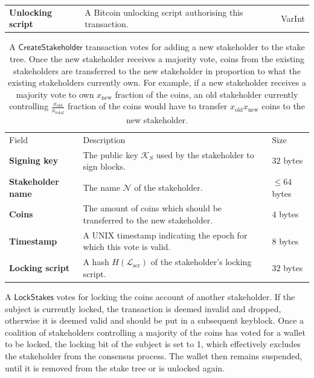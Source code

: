 \documentclass{style/kththesis}
\begin{document}
\begin{appendices}
\begin{table}[ht]
\begin{tabularx}{\textwidth}{lXl}
\textbf{Unlocking script} & A Bitcoin unlocking script authorising this transaction. & VarInt
\end{tabularx}
\end{table}
\begin{table}[ht]
\caption{A $\mathsf{CreateStakeholder}$ transaction votes for adding a new stakeholder to the stake tree. Once the new stakeholder receives a majority vote, coins from the existing stakeholders are transferred to the new stakeholder in proportion to what the existing stakeholders currently own. For example, if a new stakeholder receives a majority vote to own $x_\text{new}$ fraction of the coins, an old stakeholder currently controlling $\frac{x_\text{old}}{x_{\text{total}}}$ fraction of the coins would have to transfer $x_\text{old}x_\text{new}$ coins to the new stakeholder.}
\label{tab:create}
\begin{tabularx}{\textwidth}{lXl}
\cmidrule(r){1-3}
Field & Description & Size \\ 
\cmidrule(r){1-3}
\textbf{Signing key} & The public key $\mathcal{K}_S$ used by the stakeholder to sign blocks. & $32$ bytes \\
\textbf{Stakeholder name} & The name $\mathcal{N}$ of the stakeholder. & $\le 64$ bytes \\
\textbf{Coins} & The amount of coins which should be transferred to the new stakeholder. & $4$ bytes \\
\textbf{Timestamp} & A UNIX timestamp indicating the epoch for which this vote is valid. & $8$ bytes \\
\textbf{Locking script} & A hash $H(\mathcal{L}_{\text{scr}})$ of the stakeholder's locking script. & $32$ bytes
\end{tabularx}
\end{table}
\begin{table}[ht]
\caption{A $\mathsf{LockStakes}$ votes for locking the coins account of another stakeholder. If the subject is currently locked, the transaction is deemed invalid and dropped, otherwise it is deemed valid and should be put in a subsequent keyblock. Once a coalition of stakeholders controlling a majority of the coins has voted for a wallet to be locked, the locking bit of the subject is set to 1, which effectively excludes the stakeholder from the consensus process. The wallet then remains suspended, until it is removed from the stake tree or is unlocked again.}

\end{table}
\end{appendices}
\end{document}
